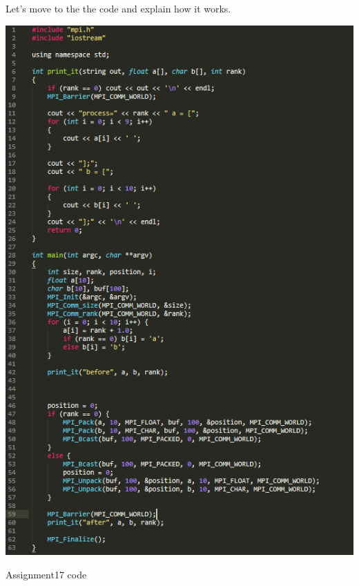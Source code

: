 \documentclass[%
12pt, %
final, %
oneside, %
onecolumn, %
centertags]{article} %
\theoremstyle{plain}
\theoremstyle{definition}
\theoremstyle{remark}
\begin{document}
Let's move to the the code and explain how it works.

\begin{center}
\includegraphics[scale=0.9]{17.code.png}

Assignment17 code
\end{center}
\end{document}
